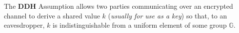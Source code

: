 \documentclass[../CryptoHW3.tex]{subfiles}
\begin{document}
\begin{flushleft}



 The \textbf{DDH} Assumption allows two parties communicating over an encrypted channel to derive a shared value $k$ (\emph{usually for use as a key}) so that, to an eavesdropper, $k$ is indistinguishable from a uniform element of some group $\mathbb{G}$.  



























\end{flushleft}
\end{document}
